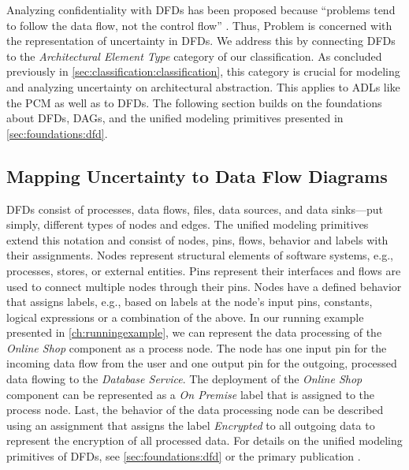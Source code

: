 Analyzing confidentiality with \acfp{DFD} \cite{tuma_flaws_2019,schneider_automatic_2023,seifermann_detecting_2022} has been proposed because \enquote{problems tend to follow the data flow, not the control flow} \cite{shostack_threat_2014}.
Thus, Problem  is concerned with the representation of uncertainty in \acp{DFD}.
We address this by connecting \acp{DFD} to the \emph{Architectural Element Type} category of our classification.
As concluded previously in \autoref{sec:classification:classification}, this category is crucial for modeling and analyzing uncertainty on architectural abstraction.
This applies to \acp{ADL} like the \ac{PCM} \cite{reussner_modeling_2016} as well as to \acp{DFD}.
The following section builds on the foundations about \acp{DFD}, \acp{DAG}, and the unified modeling primitives \cite{seifermann_unified_2021} presented in \autoref{sec:foundations:dfd}.


\subsection{Mapping Uncertainty to Data Flow Diagrams}

\acp{DFD} consist of processes, data flows, files, data sources, and data sinks---put simply, different types of nodes and edges.
The unified modeling primitives \cite{seifermann_unified_2021} extend this notation and consist of nodes, pins, flows, behavior and labels with their assignments.
Nodes represent structural elements of software systems, e.g., processes, stores, or external entities.
Pins represent their interfaces and flows are used to connect multiple nodes through their pins.
Nodes have a defined behavior that assigns labels, e.g., based on labels at the node's input pins, constants, logical expressions or a combination of the above.
In our running example presented in \autoref{ch:runningexample}, we can represent the data processing of the \emph{Online Shop} component as a process node.
The node has one input pin for the incoming data flow from the user and one output pin for the outgoing, processed data flowing to the \emph{Database Service}.
The deployment of the \emph{Online Shop} component can be represented as a \emph{On Premise} label that is assigned to the process node.
Last, the behavior of the data processing node can be described using an assignment that assigns the label \emph{Encrypted} to all outgoing data to represent the encryption of all processed data.
For details on the unified modeling primitives of \acp{DFD}, see \autoref{sec:foundations:dfd} or the primary publication \cite{seifermann_unified_2021}.

